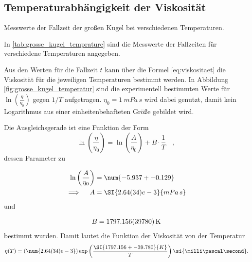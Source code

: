 \subsection{Temperaturabhängigkeit der Viskosität}

\begin{table}
  \centering
  
  \caption{Messwerte der Fallzeit der großen Kugel bei verschiedenen Temperaturen.}
  \label{tab:grosse_kugel_temprature}
\end{table}

\noindent In \autoref{tab:grosse_kugel_temprature} sind die Messwerte der Fallzeiten für verschiedene Temperaturen angegeben.


\noindent Aus den Werten für die Fallzeit $t$ kann über die Formel \eqref{eq:viskositaet} die Viskosität für die jeweiligen Temperaturen bestimmt werden.
In Abbildung \ref{fig:grosse_kugel_temperatur} sind die experimentell bestimmten Werte für $\ln{\left( \frac{\eta}{\eta_0}\right)} $ gegen $1/T$ aufgetragen.
$\eta_0 = \SI{1}{mPa \, s}$ wird dabei genutzt, damit kein Logarithmus aus einer einheitenbehafteten Größe gebildet wird.

\noindent Die Ausgleichsgerade ist eine Funktion der Form
\begin{equation*}
  \ln{\left( \frac{\eta}{\eta_0}\right)} = \ln{\left( \frac{A}{\eta_0}\right)} + B \cdot \frac{1}{T} \quad, 
\end{equation*}
dessen Parameter zu 

\begin{align*}
  \ln{\left( \frac{A}{\eta_0}\right)} &= \num{-5.937 +- 0.129 } \\
  \implies \quad A &= \SI{2.64(34)e-3}{mPa \, s}
\end{align*}
und

\begin{equation*}
  B = \SI{1797.156 +- 39.780}{K}
\end{equation*}
bestimmt wurden.
Damit lautet die Funktion der Viskosität von der Temperatur
\begin{equation*}
  \eta(T) = (\num{2.64(34)e-3}) \exp\left(\frac{\SI{1797.156 +- 39.780}{K}}{T}\right) \si{\milli\pascal\second}.
\end{equation*}

